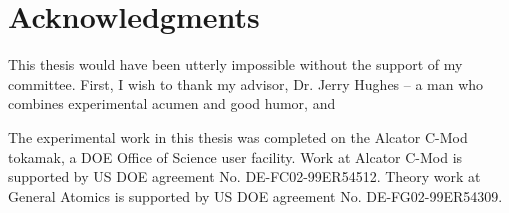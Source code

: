 
\chapter*{Acknowledgments}


This thesis would have been utterly impossible without the support of my committee.  First, I wish to thank my advisor, Dr. Jerry Hughes -- a man who combines experimental acumen and good humor, and 

The experimental work in this thesis was completed on the Alcator C-Mod tokamak, a DOE Office of Science user facility.  Work at Alcator C-Mod is supported by US DOE agreement No. DE-FC02-99ER54512.  Theory work at General Atomics is supported by US DOE agreement No. DE-FG02-99ER54309.